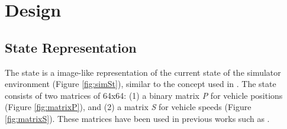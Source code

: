 \documentclass{llncs}
\begin{document}


\section{Design}

\subsection{State Representation}\label{sec:stateRep}

	The state is a image-like representation of the current state of the simulator environment (Figure \ref{fig:simSt}), similar to the concept used in \cite{Mnih2015}. The state consists of two matrices of 64x64: (1) a binary matrix \textit{P} for vehicle positions (Figure \ref{fig:matrixP}), and (2) a matrix \textit{S} for vehicle speeds (Figure \ref{fig:matrixS}). These matrices have been used in previous works such as \cite{Gao2017,Liang2018,Liu2017CooperativeDR,VanDerPol2016}. 
	
\end{document}
